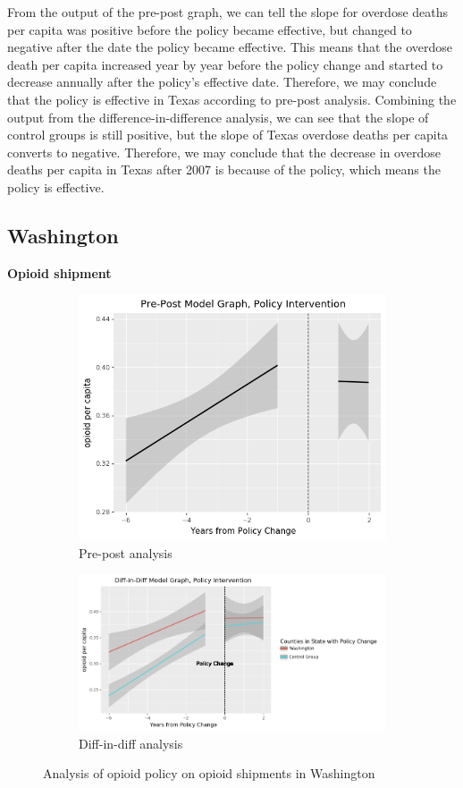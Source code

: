 \documentclass[12pt,letterpaper]{article}
\begin{document}
From the output of the pre-post graph, we can tell the slope for overdose deaths per capita was positive before the policy became effective, but changed to negative after the date the policy became effective. This means that the overdose death per capita increased year by year before the policy change and started to decrease annually after the policy’s effective date. Therefore, we may conclude that the policy is effective in Texas according to pre-post analysis. Combining the output from the difference-in-difference analysis, we can see that the slope of control groups is still positive, but the slope of Texas overdose deaths per capita converts to negative. Therefore, we may conclude that the decrease in overdose deaths per capita in Texas after 2007 is because of the policy, which means the policy is effective.

\subsection{Washington}
\textbf{Opioid shipment}

\begin{figure}[!h]
\centering
\begin{subfigure}{.5\textwidth}
  \centering
  \includegraphics[width=0.7\linewidth]{../30_results/General_Results/washington_opioid_shipment_prepost.png}
  \caption{Pre-post analysis}
  \label{fig:wa_ship_prepost}
\end{subfigure}%
\begin{subfigure}{.55\textwidth}
  \centering
  \includegraphics[width=1\linewidth]{../30_results/General_Results/washington_opioid_shipment_diffdiff.png}
  \caption{Diff-in-diff analysis}
  \label{fig:wa_ship_did}
\end{subfigure}
\caption{Analysis of opioid policy on opioid shipments in Washington}
\label{fig:wa_ship}
\end{figure}
\end{document}
